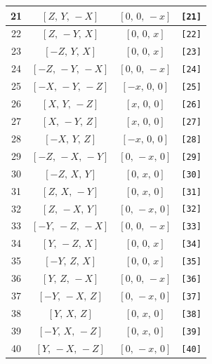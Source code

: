 \documentclass[fleqn,8pt]{jsarticle}
\begin{document}
\begin{longtable}{cccc}
21 & $\left[ Z,\, Y,\, - X \right]$ & $\left[ 0,\, 0,\, - x \right]$ & {\tt [21]} \\ \hline
22 & $\left[ Z,\, - Y,\, X \right]$ & $\left[ 0,\, 0,\, x \right]$ & {\tt [22]} \\ \hline
23 & $\left[ - Z,\, Y,\, X \right]$ & $\left[ 0,\, 0,\, x \right]$ & {\tt [23]} \\ \hline
24 & $\left[ - Z,\, - Y,\, - X \right]$ & $\left[ 0,\, 0,\, - x \right]$ & {\tt [24]} \\ \hline
25 & $\left[ - X,\, - Y,\, - Z \right]$ & $\left[ - x,\, 0,\, 0 \right]$ & {\tt [25]} \\ \hline
26 & $\left[ X,\, Y,\, - Z \right]$ & $\left[ x,\, 0,\, 0 \right]$ & {\tt [26]} \\ \hline
27 & $\left[ X,\, - Y,\, Z \right]$ & $\left[ x,\, 0,\, 0 \right]$ & {\tt [27]} \\ \hline
28 & $\left[ - X,\, Y,\, Z \right]$ & $\left[ - x,\, 0,\, 0 \right]$ & {\tt [28]} \\ \hline
29 & $\left[ - Z,\, - X,\, - Y \right]$ & $\left[ 0,\, - x,\, 0 \right]$ & {\tt [29]} \\ \hline
30 & $\left[ - Z,\, X,\, Y \right]$ & $\left[ 0,\, x,\, 0 \right]$ & {\tt [30]} \\ \hline
31 & $\left[ Z,\, X,\, - Y \right]$ & $\left[ 0,\, x,\, 0 \right]$ & {\tt [31]} \\ \hline
32 & $\left[ Z,\, - X,\, Y \right]$ & $\left[ 0,\, - x,\, 0 \right]$ & {\tt [32]} \\ \hline
33 & $\left[ - Y,\, - Z,\, - X \right]$ & $\left[ 0,\, 0,\, - x \right]$ & {\tt [33]} \\ \hline
34 & $\left[ Y,\, - Z,\, X \right]$ & $\left[ 0,\, 0,\, x \right]$ & {\tt [34]} \\ \hline
35 & $\left[ - Y,\, Z,\, X \right]$ & $\left[ 0,\, 0,\, x \right]$ & {\tt [35]} \\ \hline
36 & $\left[ Y,\, Z,\, - X \right]$ & $\left[ 0,\, 0,\, - x \right]$ & {\tt [36]} \\ \hline
37 & $\left[ - Y,\, - X,\, Z \right]$ & $\left[ 0,\, - x,\, 0 \right]$ & {\tt [37]} \\ \hline
38 & $\left[ Y,\, X,\, Z \right]$ & $\left[ 0,\, x,\, 0 \right]$ & {\tt [38]} \\ \hline
39 & $\left[ - Y,\, X,\, - Z \right]$ & $\left[ 0,\, x,\, 0 \right]$ & {\tt [39]} \\ \hline
40 & $\left[ Y,\, - X,\, - Z \right]$ & $\left[ 0,\, - x,\, 0 \right]$ & {\tt [40]} \\ \hline

\end{longtable}
\end{document}
